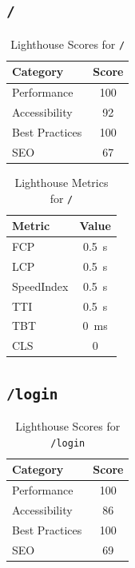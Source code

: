 \subsection{\texttt{/}}

\begin{table}[H]
  \centering
  \caption{Lighthouse Scores for \texttt{/}}
  \begin{tabular}{|l|c|}
    \hline
    Category & Score \\ \hline
    Performance & 100 \\ \hline
    Accessibility & 92 \\ \hline
    Best Practices & 100 \\ \hline
    SEO & 67 \\ \hline
  \end{tabular}
\end{table}

\begin{table}[H]
  \centering
  \caption{Lighthouse Metrics for \texttt{/}}
  \begin{tabular}{|l|c|}
    \hline
    Metric & Value \\ \hline
    FCP & 0.5 s \\ \hline
    LCP & 0.5 s \\ \hline
    SpeedIndex & 0.5 s \\ \hline
    TTI & 0.5 s \\ \hline
    TBT & 0 ms \\ \hline
    CLS & 0 \\ \hline
  \end{tabular}
\end{table}
\subsection{\texttt{/login}}

\begin{table}[H]
  \centering
  \caption{Lighthouse Scores for \texttt{/login}}
  \begin{tabular}{|l|c|}
    \hline
    Category & Score \\ \hline
    Performance & 100 \\ \hline
    Accessibility & 86 \\ \hline
    Best Practices & 100 \\ \hline
    SEO & 69 \\ \hline
  \end{tabular}
\end{table}

